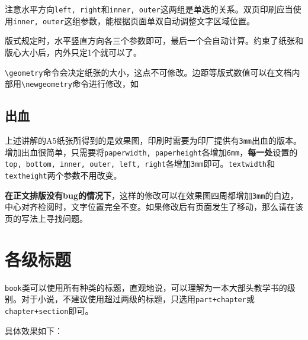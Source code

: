 \documentclass[10pt,openany]{book}
\begin{document}
注意水平方向\texttt{left,\ right}和\texttt{inner,\ outer}这两组是单选的关系。双页印刷应当使用\texttt{inner,\ outer}这组参数，能根据页面单双自动调整文字区域位置。



版式规定时，水平竖直方向各三个参数即可，最后一个会自动计算。约束了纸张和版心大小后，内外只定1个就可以了。

\texttt{\textbackslash{}geometry}命令会决定纸张的大小，这点不可修改。边距等版式数值可以在文档内部用\texttt{\textbackslash{}newgeometry}命令进行修改，如



\subsection{出血}

上述讲解的A5纸张所得到的是效果图，印刷时需要为印厂提供有\texttt{3mm}出血的版本。增加出血很简单，只需要将\texttt{paperwidth,\ paperheight}各增加\texttt{6mm}，\textbf{每一处}设置的\texttt{top,\ bottom,\ inner,\ outer,\ left,\ right}各增加\texttt{3mm}即可。\texttt{textwidth}和\texttt{textheight}两个参数不用改变。

\textbf{在正文排版没有bug的情况下}，这样的修改可以在效果图四周都增加\texttt{3mm}的白边，中心对齐检阅时，文字位置完全不变。如果修改后有页面发生了移动，那么请在该页的写法上寻找问题。

\section{各级标题}

\texttt{book}类可以使用所有种类的标题，直观地说，可以理解为一本大部头教学书的级别。对于小说，不建议使用超过两级的标题，只选用\texttt{part+chapter}或\texttt{chapter+section}即可。

具体效果如下：
\end{document}
